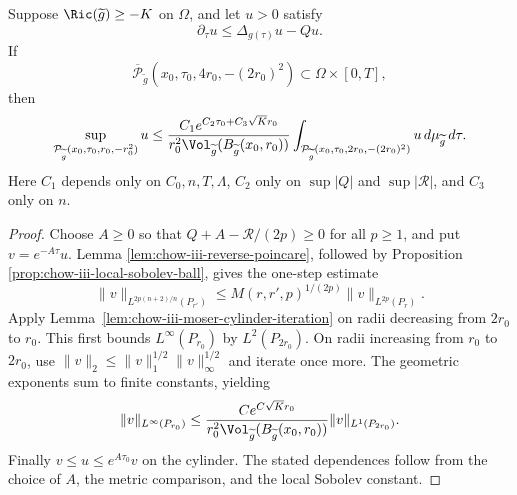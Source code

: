 \begin{theorem}
\label{thm:chow-iii-evolving-parabolic-mean-value}
Suppose \(\Ric(\widetilde g)\geq-K\) on \(\Omega\), and let \(u>0\)
satisfy
\[
 \partial_\tau u\leq\Delta_{g(\tau)}u-Qu.
\]
If
\[
 \overline{\mathcal P}_{\widetilde g}
 (x_0,\tau_0,4r_0,-(2r_0)^2)\subset\Omega\times[0,T],
\]
then
\[
 \sup_{\mathcal P_{\widetilde g}(x_0,\tau_0,r_0,-r_0^2)}u
 \leq
 \frac{C_1e^{C_2\tau_0+C_3\sqrt K r_0}}
 {r_0^2\Vol_{\widetilde g}(B_{\widetilde g}(x_0,r_0))}
 \int_{\mathcal P_{\widetilde g}(x_0,\tau_0,2r_0,-(2r_0)^2)}
 u\,d\mu_{\widetilde g}\,d\tau.
\]
Here \(C_1\) depends only on \(C_0,n,T,\Lambda\), \(C_2\) only on
\(\sup|Q|\) and \(\sup|\mathcal R|\), and \(C_3\) only on \(n\).
\end{theorem}
\begin{proof}
\sketch Choose \(A\geq0\) so that \(Q+A-\mathcal R/(2p)\geq0\) for all
\(p\geq1\), and put \(v=e^{-A\tau}u\).  Lemma
\ref{lem:chow-iii-reverse-poincare}, followed by Proposition
\ref{prop:chow-iii-local-sobolev-ball}, gives the one-step estimate
\[
 \|v\|_{L^{2p(n+2)/n}(P_{r'})}
 \leq M(r,r',p)^{1/(2p)}\|v\|_{L^{2p}(P_r)}.
\]
Apply Lemma~\ref{lem:chow-iii-moser-cylinder-iteration} on radii decreasing
from \(2r_0\) to \(r_0\).  This first bounds \(L^\infty(P_{r_0})\) by
\(L^2(P_{2r_0})\).  On radii increasing from \(r_0\) to \(2r_0\), use
\(\|v\|_2\leq\|v\|_1^{1/2}\|v\|_\infty^{1/2}\) and iterate once more.
The geometric exponents sum to finite constants, yielding
\[
 \|v\|_{L^\infty(P_{r_0})}
 \leq \frac{C e^{C\sqrt K r_0}}
 {r_0^2\Vol_{\widetilde g}(B_{\widetilde g}(x_0,r_0))}
 \|v\|_{L^1(P_{2r_0})}.
\]
Finally \(v\leq u\leq e^{A\tau_0}v\) on the cylinder.  The stated
dependences follow from the choice of \(A\), the metric comparison, and the
local Sobolev constant.
\end{proof}


